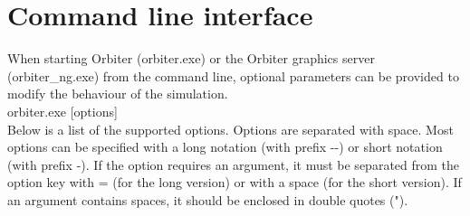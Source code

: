 \documentclass[Orbiter User Manual.tex]{subfiles}
\begin{document}
\section{Command line interface}
When starting Orbiter (orbiter.exe) or the Orbiter graphics server (orbiter\_ng.exe) from the command line, optional parameters can be provided to modify the behaviour of the simulation.\\
orbiter.exe [options]\\
Below is a list of the supported options. Options are separated with space. Most options can be specified with a long notation (with prefix -{}-) or short notation (with prefix -). If the option requires an argument, it must be separated from the option key with = (for the long version) or with a space (for the short version). If an argument contains spaces, it should be enclosed in double quotes (").
\end{document}
